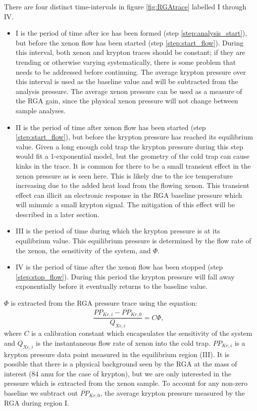 \documentclass[12pt]{article}
\begin{document}
There are four distinct time-intervals in figure \ref{fig:RGAtrace} labelled I through IV. 
\begin{itemize}
\item I is the period of time after ice has been formed (step \ref{step:analysis_start}), but before the xenon flow has been started (step \ref{step:start_flow}). During this interval, both xenon and krypton traces should be constant; if they are trending or otherwise varying systematically, there is some problem that needs to be addressed before continuing. The average krypton pressure over this interval is used as the baseline value and will be subtracted from the analysis pressure. The average xenon pressure can be used as a measure of the RGA gain, since the physical xenon pressure will not change between sample analyses. 
\item II is the period of time after xenon flow has been started (step \ref{step:start_flow}), but before the krypton pressure has reached its equilibrium value. Given a long enough cold trap the krypton pressure during this step would fit a 1-exponential model, but the geometry of the cold trap can cause kinks in the trace. It is common for there to be a small transient effect in the xenon pressure as is seen here. This is likely due to the ice temperature increasing due to the added heat load from the flowing xenon. This transient effect can illicit an electronic response in the RGA baseline pressure which will mimmic a small krypton signal. The mitigation of this effect will be described in a later section.
\item III is the period of time during which the krypton pressure is at its equilibrium value. This equilibrium pressure is determined by the flow rate of the xenon, the sensitivity of the system, and $\Phi$.
\item IV is the period of time after the xenon flow has been stopped (step \ref{step:stop_flow}). During this period the krypton pressure will fall away exponentially before it eventually returns to the baseline value.
\end{itemize}

$\Phi$ is extracted from the RGA pressure trace using the equation:
\begin{equation}
\label{eq:basic_analysis}
\frac{PP_{Kr,i}-\overline{PP}_{Kr,0}}{Q_{Xe,i}}=C\Phi,
\end{equation}
where $C$ is a calibration constant which encapsulates the sensitivity of the system and $Q_{Xe,i}$ is the instantaneous flow rate of xenon into the cold trap. $PP_{Kr,i}$ is a krypton pressure data point measured in the equilibrium region (III). It is possible that there is a physical background seen by the RGA at the mass of interest (84 amu for the case of krypton), but we are only interested in the pressure which is extracted from the xenon sample. To account for any non-zero baseline we subtract out $\overline{PP}_{Kr,0}$, the average krypton pressure measured by the RGA during region I. 
\end{document}
